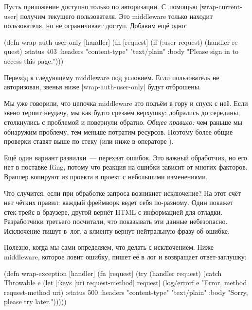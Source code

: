Пусть приложение доступно только по авторизации. С~помощью
\spverb|wrap-current-user| получим текущего пользователя. Это middleware только
находит пользователя, но не ограничивает доступ. Добавим ещ\"{е} одно:


\begin{english}
  \begin{clojure}
(defn wrap-auth-user-only [handler]
  (fn [request]
    (if (:user request)
      (handler request)
      {:status 403
       :headers {"content-type" "text/plain"}
       :body "Please sign in to access this page."})))
  \end{clojure}
\end{english}

Переход к следующему middleware под условием. Если пользователь не
авторизован, звенья ниже \spverb|wrap-auth-user-only| будут отброшены.

Мы уже говорили, что цепочка middleware это подъ\"{е}м в гору и спуск с
не\"{е}. Если звено терпит неудачу, мы как будто срезаем верхушку: добрались до
середины, столкнулись с проблемой и повернули обратно. \emph{Общее правило:} чем
раньше мы обнаружим проблему, тем меньше потратим ресурсов. Поэтому более общие
проверки ставят выше по стеку (или ниже в операторе \arr).


Ещ\"{е} один вариант развилки~--- перехват ошибок. Это важный обработчик, но его
нет в поставке Ring, потому что реакция на ошибки зависит от многих
факторов. Враппер копируют из проекта в проект с небольшими изменениями.

Что случится, если при обработке запроса возникнет исключение? На этот сч\"{е}т
нет ч\"{е}тких правил: каждый фреймворк ведет себя по-разному. Один покажет
стек-трейс в браузере, другой верн\"{е}т HTML с информацией для
отладки. Разработчики третьего посчитали, что показывать эти данные
небезопасно. Исключение пишут в~лог, а клиенту вернут нейтральную фразу об
ошибке.

Полезно, когда мы сами определяем, что делать с исключением. Ниже middleware,
которое ловит ошибку, пишет е\"{е} в лог и возвращает ответ-заглушку:


\begin{english}
  \begin{clojure}
(defn wrap-exception [handler]
  (fn [request]
    (try
      (handler request)
      (catch Throwable e
        (let [{:keys [uri request-method]} request]
          (log/errorf e "Error, method %
                      request-method uri)
          {:status 500
           :headers {"content-type" "text/plain"}
           :body "Sorry, please try later."})))))
  \end{clojure}
\end{english}

